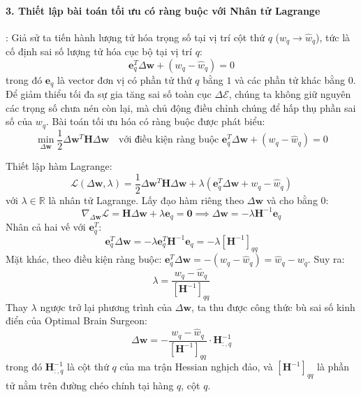 \paragraph{3. Thiết lập bài toán tối ưu có ràng buộc với Nhân tử Lagrange}:
Giả sử ta tiến hành lượng tử hóa trọng số tại vị trí cột thứ $q$ ($w_q \to \hat{w}_q$), tức là cố định sai số lượng tử hóa cục bộ tại vị trí $q$:
\begin{equation}
\mathbf{e}_q^T \Delta \mathbf{w} + (w_q - \hat{w}_q) = 0
\end{equation}
trong đó $\mathbf{e}_q$ là vector đơn vị có phần tử thứ $q$ bằng $1$ và các phần tử khác bằng $0$.
Để giảm thiểu tối đa sự gia tăng sai số toàn cục $\Delta \mathcal{E}$, chúng ta không giữ nguyên các trọng số chưa nén còn lại, mà chủ động điều chỉnh chúng để hấp thụ phần sai số của $w_q$. Bài toán tối ưu hóa có ràng buộc được phát biểu:
\begin{equation}
\min_{\Delta \mathbf{w}} \frac{1}{2} \Delta \mathbf{w}^T \mathbf{H} \Delta \mathbf{w} \quad \text{với điều kiện ràng buộc } \mathbf{e}_q^T \Delta \mathbf{w} + (w_q - \hat{w}_q) = 0
\end{equation}

Thiết lập hàm Lagrange:
\begin{equation}
\mathcal{L}(\Delta \mathbf{w}, \lambda) = \frac{1}{2} \Delta \mathbf{w}^T \mathbf{H} \Delta \mathbf{w} + \lambda \left( \mathbf{e}_q^T \Delta \mathbf{w} + w_q - \hat{w}_q \right)
\end{equation}
với $\lambda \in \mathbb{R}$ là nhân tử Lagrange. Lấy đạo hàm riêng theo $\Delta \mathbf{w}$ và cho bằng $0$:
\begin{equation}
\nabla_{\Delta \mathbf{w}} \mathcal{L} = \mathbf{H} \Delta \mathbf{w} + \lambda \mathbf{e}_q = \mathbf{0} \implies \Delta \mathbf{w} = -\lambda \mathbf{H}^{-1} \mathbf{e}_q
\end{equation}
Nhân cả hai vế với $\mathbf{e}_q^T$:
\begin{equation}
\mathbf{e}_q^T \Delta \mathbf{w} = -\lambda \mathbf{e}_q^T \mathbf{H}^{-1} \mathbf{e}_q = -\lambda [\mathbf{H}^{-1}]_{qq}
\end{equation}
Mặt khác, theo điều kiện ràng buộc: $\mathbf{e}_q^T \Delta \mathbf{w} = -(w_q - \hat{w}_q) = \hat{w}_q - w_q$. Suy ra:
\begin{equation}
\lambda = \frac{w_q - \hat{w}_q}{[\mathbf{H}^{-1}]_{qq}}
\end{equation}
Thay $\lambda$ ngược trở lại phương trình của $\Delta \mathbf{w}$, ta thu được công thức bù sai số kinh điển của Optimal Brain Surgeon:
\begin{equation}
\Delta \mathbf{w} = - \frac{w_q - \hat{w}_q}{[\mathbf{H}^{-1}]_{qq}} \cdot \mathbf{H}^{-1}_{:, q}
\end{equation}
trong đó $\mathbf{H}^{-1}_{:, q}$ là cột thứ $q$ của ma trận Hessian nghịch đảo, và $[\mathbf{H}^{-1}]_{qq}$ là phần tử nằm trên đường chéo chính tại hàng $q$, cột $q$.

